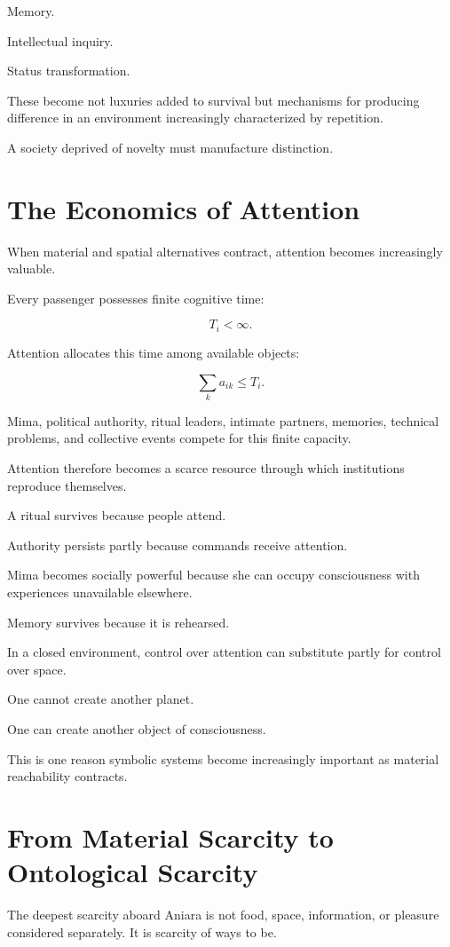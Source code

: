 \documentclass[11pt,oneside]{book}
\theoremstyle{definition}
\theoremstyle{remark}
\begin{document}
Memory.

Intellectual inquiry.

Status transformation.

These become not luxuries added to survival but mechanisms for producing difference in an environment increasingly characterized by repetition.

A society deprived of novelty must manufacture distinction.

\section{The Economics of Attention}

When material and spatial alternatives contract, attention becomes increasingly valuable.

Every passenger possesses finite cognitive time:

\[
T_i<\infty.
\]

Attention allocates this time among available objects:

\[
\sum_k a_{ik}
\leq
T_i.
\]

Mima, political authority, ritual leaders, intimate partners, memories, technical problems, and collective events compete for this finite capacity.

Attention therefore becomes a scarce resource through which institutions reproduce themselves.

A ritual survives because people attend.

Authority persists partly because commands receive attention.

Mima becomes socially powerful because she can occupy consciousness with experiences unavailable elsewhere.

Memory survives because it is rehearsed.

In a closed environment, control over attention can substitute partly for control over space.

One cannot create another planet.

One can create another object of consciousness.

This is one reason symbolic systems become increasingly important as material reachability contracts.

\section{From Material Scarcity to Ontological Scarcity}

The deepest scarcity aboard Aniara is not food, space, information, or pleasure considered separately. It is scarcity of ways to be.
\end{document}

